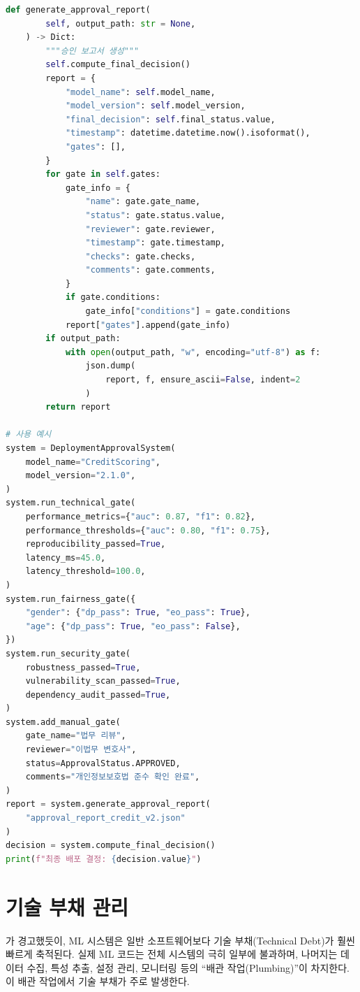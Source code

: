 \begin{lstlisting}[language=Python, caption={배포 승인 자동화 시스템}, label={lst:deployment_approval}]
    def generate_approval_report(
        self, output_path: str = None,
    ) -> Dict:
        """승인 보고서 생성"""
        self.compute_final_decision()
        report = {
            "model_name": self.model_name,
            "model_version": self.model_version,
            "final_decision": self.final_status.value,
            "timestamp": datetime.datetime.now().isoformat(),
            "gates": [],
        }
        for gate in self.gates:
            gate_info = {
                "name": gate.gate_name,
                "status": gate.status.value,
                "reviewer": gate.reviewer,
                "timestamp": gate.timestamp,
                "checks": gate.checks,
                "comments": gate.comments,
            }
            if gate.conditions:
                gate_info["conditions"] = gate.conditions
            report["gates"].append(gate_info)
        if output_path:
            with open(output_path, "w", encoding="utf-8") as f:
                json.dump(
                    report, f, ensure_ascii=False, indent=2
                )
        return report

# 사용 예시
system = DeploymentApprovalSystem(
    model_name="CreditScoring",
    model_version="2.1.0",
)
system.run_technical_gate(
    performance_metrics={"auc": 0.87, "f1": 0.82},
    performance_thresholds={"auc": 0.80, "f1": 0.75},
    reproducibility_passed=True,
    latency_ms=45.0,
    latency_threshold=100.0,
)
system.run_fairness_gate({
    "gender": {"dp_pass": True, "eo_pass": True},
    "age": {"dp_pass": True, "eo_pass": False},
})
system.run_security_gate(
    robustness_passed=True,
    vulnerability_scan_passed=True,
    dependency_audit_passed=True,
)
system.add_manual_gate(
    gate_name="법무 리뷰",
    reviewer="이법무 변호사",
    status=ApprovalStatus.APPROVED,
    comments="개인정보보호법 준수 확인 완료",
)
report = system.generate_approval_report(
    "approval_report_credit_v2.json"
)
decision = system.compute_final_decision()
print(f"최종 배포 결정: {decision.value}")
\end{lstlisting}

\section{기술 부채 관리}
\label{sec:10.7}

\cite{sculley2015hidden}가 경고했듯이, ML 시스템은 일반 소프트웨어보다 기술 부채(Technical Debt)가 훨씬 빠르게 축적된다. 실제 ML 코드는 전체 시스템의 극히 일부에 불과하며, 나머지는 데이터 수집, 특성 추출, 설정 관리, 모니터링 등의 ``배관 작업(Plumbing)''이 차지한다. 이 배관 작업에서 기술 부채가 주로 발생한다.

